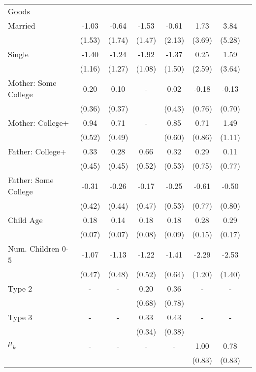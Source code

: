 \begin{tabular}{lccccccc}
Goods}\\\cmidrule(r){2-8}Married&-1.03&-0.64&-1.53&-0.61&1.73&3.84&\\&(1.53)&(1.74)&(1.47)&(2.13)&(3.69)&(5.28)&\\Single&-1.40&-1.24&-1.92&-1.37&0.25&1.59&\\&(1.16)&(1.27)&(1.08)&(1.50)&(2.59)&(3.64)&\\Mother: Some College&0.20&0.10&-&0.02&-0.18&-0.13&\\&(0.36)&(0.37)&&(0.43)&(0.76)&(0.70)&\\Mother: College+&0.94&0.71&-&0.85&0.71&1.49&\\&(0.52)&(0.49)&&(0.60)&(0.86)&(1.11)&\\Father: College+&0.33&0.28&0.66&0.32&0.29&0.11&\\&(0.45)&(0.45)&(0.52)&(0.53)&(0.75)&(0.77)&\\Father: Some College&-0.31&-0.26&-0.17&-0.25&-0.61&-0.50&\\&(0.42)&(0.44)&(0.47)&(0.53)&(0.77)&(0.80)&\\Child Age&0.18&0.14&0.18&0.18&0.28&0.29&\\&(0.07)&(0.07)&(0.08)&(0.09)&(0.15)&(0.17)&\\Num. Children 0-5&-1.07&-1.13&-1.22&-1.41&-2.29&-2.53&\\&(0.47)&(0.48)&(0.52)&(0.64)&(1.20)&(1.40)&\\Type 2&-&-&0.20&0.36&-&-&\\&&&(0.68)&(0.78)&&&\\Type 3&-&-&0.33&0.43&-&-&\\&&&(0.34)&(0.38)&&&\\$\mu_{k}$&-&-&-&-&1.00&0.78&\\&&&&&(0.83)&(0.83)&\\\bottomrule\end{tabular}